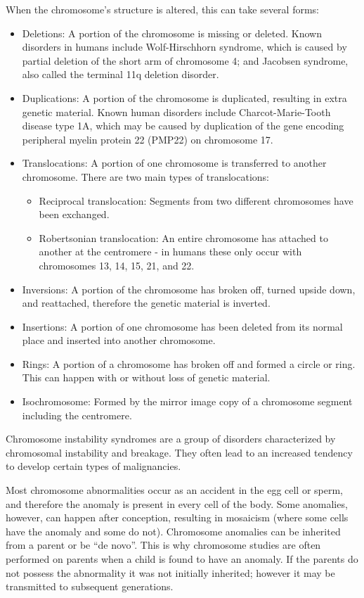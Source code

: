 When the chromosome's structure is altered, this can take several forms:

\begin{itemize}
\tightlist
\item
  Deletions: A portion of the chromosome is missing or deleted. Known disorders in humans include Wolf-Hirschhorn syndrome, which is caused by partial deletion of the short arm of chromosome 4; and Jacobsen syndrome, also called the terminal 11q deletion disorder.
\item
  Duplications: A portion of the chromosome is duplicated, resulting in extra genetic material. Known human disorders include Charcot-Marie-Tooth disease type 1A, which may be caused by duplication of the gene encoding peripheral myelin protein 22 (PMP22) on chromosome 17.
\item
  Translocations: A portion of one chromosome is transferred to another chromosome. There are two main types of translocations:

  \begin{itemize}
  \tightlist
  \item
    Reciprocal translocation: Segments from two different chromosomes have been exchanged.
  \item
    Robertsonian translocation: An entire chromosome has attached to another at the centromere - in humans these only occur with chromosomes 13, 14, 15, 21, and 22.
  \end{itemize}
\item
  Inversions: A portion of the chromosome has broken off, turned upside down, and reattached, therefore the genetic material is inverted.
\item
  Insertions: A portion of one chromosome has been deleted from its normal place and inserted into another chromosome.
\item
  Rings: A portion of a chromosome has broken off and formed a circle or ring. This can happen with or without loss of genetic material.
\item
  Isochromosome: Formed by the mirror image copy of a chromosome segment including the centromere.
\end{itemize}

Chromosome instability syndromes are a group of disorders characterized by chromosomal instability and breakage. They often lead to an increased tendency to develop certain types of malignancies.

Most chromosome abnormalities occur as an accident in the egg cell or sperm, and therefore the anomaly is present in every cell of the body. Some anomalies, however, can happen after conception, resulting in mosaicism (where some cells have the anomaly and some do not). Chromosome anomalies can be inherited from a parent or be ``de novo''. This is why chromosome studies are often performed on parents when a child is found to have an anomaly. If the parents do not possess the abnormality it was not initially inherited; however it may be transmitted to subsequent generations.

